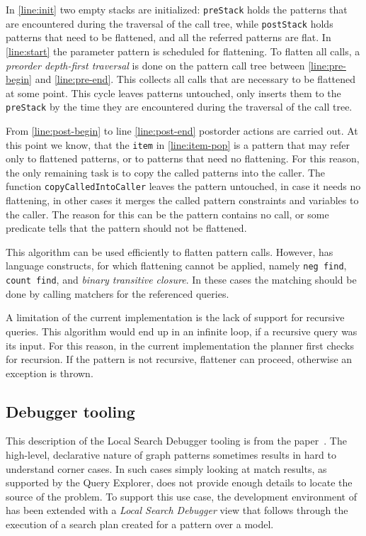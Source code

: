 In \autoref{line:init} two empty stacks are initialized: \texttt{preStack} holds the patterns that are encountered during the traversal of the call tree, while \texttt{postStack} holds patterns that need to be flattened, and all the referred patterns are flat. In \autoref{line:start} the parameter pattern is scheduled for flattening. To flatten all calls, a \emph{preorder depth-first traversal} is done on the pattern call tree between \autoref{line:pre-begin} and \autoref{line:pre-end}. This collects all calls that are necessary to be flattened at some point. This cycle leaves patterns untouched, only inserts them to the \texttt{preStack} by the time they are encountered during the traversal of the call tree.

From \autoref{line:post-begin} to line \autoref{line:post-end} postorder actions are carried out. At this point we know, that the \texttt{item} in \autoref{line:item-pop} is a pattern that may refer only to flattened patterns, or to patterns that need no flattening. For this reason, the only remaining task is to copy the called patterns into the caller. The function \texttt{copyCalledIntoCaller} leaves the pattern untouched, in case it needs no flattening, in other cases it merges the called pattern constraints and variables to the caller. The reason for this can be the pattern contains no call, or some predicate tells that the pattern should not be flattened.

This algorithm can be used efficiently to flatten pattern calls. However, \eiq has language constructs, for which flattening cannot be applied, namely \texttt{neg find}, \texttt{count find}, and \emph{binary transitive closure}. In these cases the matching should be done by calling matchers for the referenced queries.

A limitation of the current implementation is the lack of support for recursive queries. This algorithm would end up in an infinite loop, if a recursive query was its input. For this reason, in the current implementation the planner first checks for recursion. If the pattern is not recursive, flattener can proceed, otherwise an exception is thrown.

\subsection{Debugger tooling}
\label{sec:lsdebugger}

This description of the Local Search Debugger tooling is from the paper~\cite{DBLP:conf/gg/BurUHV15}. The high-level, declarative nature of graph patterns sometimes results in hard to understand corner cases. In such cases simply looking at match results, as supported by the Query Explorer, does not provide enough details to locate the source of the problem. To support this use case, the development environment of \eiq has been extended with a \emph{Local Search Debugger} view that follows through the execution of a search plan created for a pattern over a model.


